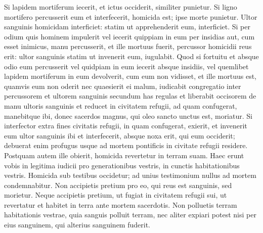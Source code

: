 \begin{biblechapter}
\begin{biblechapter}
\begin{biblechapter}
\begin{biblechapter}
\begin{biblechapter}
\begin{biblechapter}
\begin{biblechapter}
\begin{biblechapter}
\begin{biblechapter}
\begin{biblechapter}
\begin{biblechapter}
\begin{biblechapter}
\begin{biblechapter}
\begin{biblechapter}
\begin{biblechapter}
\begin{biblechapter}
\begin{biblechapter}
\begin{biblechapter}
\begin{biblechapter}
\begin{biblechapter}
\begin{biblechapter}
\begin{biblechapter}
\begin{biblechapter}
\begin{biblechapter}
\begin{biblechapter}
\begin{biblechapter}
\begin{biblechapter}
\begin{biblechapter}
\begin{biblechapter}
\begin{biblechapter}
\begin{biblechapter}
\begin{biblechapter}
\begin{biblechapter}
\begin{biblechapter}
\begin{biblechapter}
\verse Si lapidem mortiferum iecerit, et ictus occiderit, similiter punietur. 
\verse Si ligno mortifero percusserit eum et interfecerit, homicida est; ipse morte punietur. 
\verse Ultor sanguinis homicidam interficiet: statim ut apprehenderit eum, interficiet. 
\verse Si per odium quis hominem impulerit vel iecerit quippiam in eum per insidias 
\verse aut, cum esset inimicus, manu percusserit, et ille mortuus fuerit, percussor homicidii reus erit: ultor sanguinis statim ut invenerit eum, iugulabit.
 \verse Quod si fortuitu et absque odio eum percusserit vel quidpiam in eum iecerit absque insidiis, 
\verse vel quemlibet lapidem mortiferum in eum devolverit, cum eum non vidisset, et ille mortuus est, quamvis eum non oderit nec quaesierit ei malum, 
\verse iudicabit congregatio inter percussorem et ultorem sanguinis secundum has regulas 
\verse et liberabit occisorem de manu ultoris sanguinis et reducet in civitatem refugii, ad quam confugerat, manebitque ibi, donec sacerdos magnus, qui oleo sancto unctus est, moriatur. 
\verse Si interfector extra fines civitatis refugii, in quam confugerat, exierit, 
\verse et invenerit eum ultor sanguinis ibi et interfecerit, absque noxa erit, qui eum occiderit; 
\verse debuerat enim profugus usque ad mortem pontificis in civitate refugii residere. Postquam autem ille obierit, homicida revertetur in terram suam. 
\verse Haec erunt vobis in legitima iudicii pro generationibus vestris, in cunctis habitationibus vestris.
 \verse Homicida sub testibus occidetur; ad unius testimonium nullus ad mortem condemnabitur. 
\verse Non accipietis pretium pro eo, qui reus est sanguinis, sed morietur. 
\verse Neque accipietis pretium, ut fugiat in civitatem refugii sui, ut revertatur et habitet in terra ante mortem sacerdotis. 
\verse Non polluetis terram habitationis vestrae, quia sanguis polluit terram, nec aliter expiari potest nisi per eius sanguinem, qui alterius sanguinem fuderit. 

\end{biblechapter}
\end{biblechapter}
\end{biblechapter}
\end{biblechapter}
\end{biblechapter}
\end{biblechapter}
\end{biblechapter}
\end{biblechapter}
\end{biblechapter}
\end{biblechapter}
\end{biblechapter}
\end{biblechapter}
\end{biblechapter}
\end{biblechapter}
\end{biblechapter}
\end{biblechapter}
\end{biblechapter}
\end{biblechapter}
\end{biblechapter}
\end{biblechapter}
\end{biblechapter}
\end{biblechapter}
\end{biblechapter}
\end{biblechapter}
\end{biblechapter}
\end{biblechapter}
\end{biblechapter}
\end{biblechapter}
\end{biblechapter}
\end{biblechapter}
\end{biblechapter}
\end{biblechapter}
\end{biblechapter}
\end{biblechapter}
\end{biblechapter}
